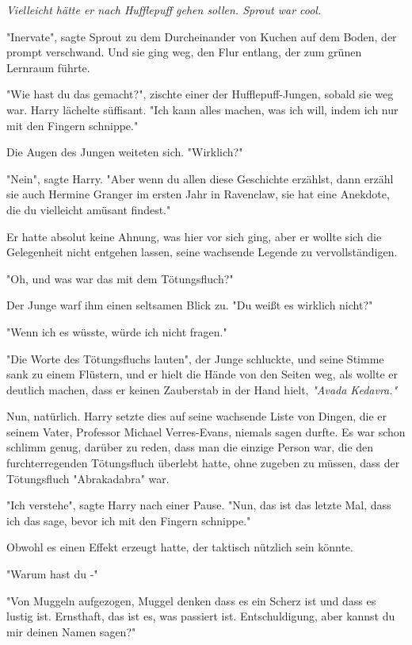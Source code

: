 {\emph{Vielleicht hätte er nach Hufflepuff gehen sollen. Sprout war cool.}

"Inervate", sagte Sprout zu dem Durcheinander von Kuchen auf dem Boden, der prompt verschwand. Und sie ging weg, den Flur entlang, der zum grünen Lernraum führte.

"Wie hast du das gemacht?", zischte einer der Hufflepuff-Jungen, sobald sie weg war. Harry lächelte süffisant. "Ich kann alles machen, was ich will, indem ich nur mit den Fingern schnippe."

Die Augen des Jungen weiteten sich. "Wirklich?"

"Nein", sagte Harry. "Aber wenn du allen diese Geschichte erzählst, dann erzähl sie auch Hermine Granger im ersten Jahr in Ravenclaw, sie hat eine Anekdote, die du vielleicht amüsant findest."

Er hatte absolut keine Ahnung, was hier vor sich ging, aber er wollte sich die Gelegenheit nicht entgehen lassen, seine wachsende Legende zu vervollständigen.

"Oh, und was war das mit dem Tötungsfluch?"

Der Junge warf ihm einen seltsamen Blick zu. "Du weißt es wirklich nicht?"

"Wenn ich es wüsste, würde ich nicht fragen."

"Die Worte des Tötungsfluchs lauten", der Junge schluckte, und seine Stimme sank zu einem Flüstern, und er hielt die Hände von den Seiten weg, als wollte er deutlich machen, dass er keinen Zauberstab in der Hand hielt, \emph{"Avada Kedavra."}

Nun, natürlich. Harry setzte dies auf seine wachsende Liste von Dingen, die er seinem Vater, Professor Michael Verres-Evans, niemals sagen durfte. Es war schon schlimm genug, darüber zu reden, dass man die einzige Person war, die den furchterregenden Tötungsfluch überlebt hatte, ohne zugeben zu müssen, dass der Tötungsfluch "Abrakadabra" war.

"Ich verstehe", sagte Harry nach einer Pause. "Nun, das ist das letzte Mal, dass ich das sage, bevor ich mit den Fingern schnippe."

Obwohl es einen Effekt erzeugt hatte, der taktisch nützlich sein könnte.

"Warum hast du -"

"Von Muggeln aufgezogen, Muggel denken dass es ein Scherz ist und dass es lustig ist. Ernsthaft, das ist es, was passiert ist. Entschuldigung, aber kannst du mir deinen Namen sagen?"

}
